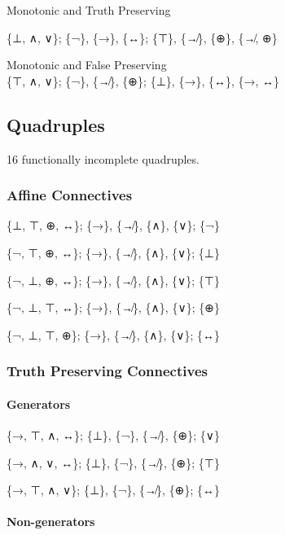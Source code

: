 Monotonic and Truth Preserving

\{⊥, ∧, ∨\}; \{¬\}, \{→\}, \{↔\}; \{⊤\}, \{↛\}, \{⊕\}, \{↛, ⊕\}

Monotonic and False Preserving\\
\{⊤, ∧, ∨\}; \{¬\}, \{↛\}, \{⊕\}; \{⊥\}, \{→\}, \{↔\}, \{→, ↔\}

\hypertarget{quadruples}{%
\subsection{Quadruples}\label{quadruples}}

16 functionally incomplete quadruples.

\hypertarget{affine-connectives-1}{%
\subsubsection{Affine Connectives}\label{affine-connectives-1}}

\{⊥, ⊤, ⊕, ↔\}; \{→\}, \{↛\}, \{∧\}, \{∨\}; \{¬\}

\{¬, ⊤, ⊕, ↔\}; \{→\}, \{↛\}, \{∧\}, \{∨\}; \{⊥\}

\{¬, ⊥, ⊕, ↔\}; \{→\}, \{↛\}, \{∧\}, \{∨\}; \{⊤\}

\{¬, ⊥, ⊤, ↔\}; \{→\}, \{↛\}, \{∧\}, \{∨\}; \{⊕\}

\{¬, ⊥, ⊤, ⊕\}; \{→\}, \{↛\}, \{∧\}, \{∨\}; \{↔\}

\hypertarget{truth-preserving-connectives-1}{%
\subsubsection{Truth Preserving
Connectives}\label{truth-preserving-connectives-1}}

\hypertarget{generators-3}{%
\paragraph{Generators}\label{generators-3}}

\{→, ⊤, ∧, ↔\}; \{⊥\}, \{¬\}, \{↛\}, \{⊕\}; \{∨\}

\{→, ∧, ∨, ↔\}; \{⊥\}, \{¬\}, \{↛\}, \{⊕\}; \{⊤\}

\{→, ⊤, ∧, ∨\}; \{⊥\}, \{¬\}, \{↛\}, \{⊕\}; \{↔\}

\hypertarget{non-generators-3}{%
\paragraph{Non-generators}\label{non-generators-3}}

